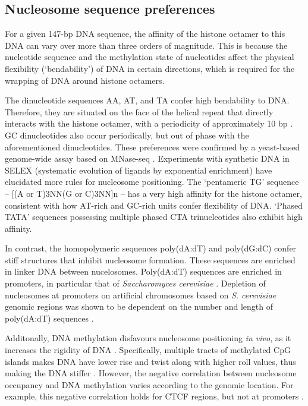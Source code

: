 \documentclass[parskip=full, numbers=noenddot]{scrreprt}
\begin{document}
\subsection{Nucleosome sequence preferences}
\label{ssec:emsaselex_intro_seqpref}

For a given 147-bp DNA sequence, the affinity of the histone octamer to this DNA can vary over more than three orders of magnitude.  This is because the nucleotide sequence and the methylation state of nucleotides affect the physical flexibility (`bendability') of DNA in certain directions, which is required for the wrapping of DNA around histone octamers.

The dinucleotide sequences AA, AT, and TA confer high bendability to DNA.  Therefore, they are situated on the face of the helical repeat that directly interacts with the histone octamer, with a periodicity of approximately 10 bp \citep{struhl_determinants_2013}.  GC dinucleotides also occur periodically, but out of phase with the aforementioned dinucleotides.  These preferences were confirmed by a yeast-based genome-wide assay based on MNase-seq \citep{segal_genomic_2006}.  Experiments with synthetic DNA in SELEX (systematic evolution of ligands by exponential enrichment) \citep{lowary_new_1998} have elucidated more rules for nucleosome positioning.  The `pentameric TG' sequence -- [(A or T)3NN(G or C)3NN]n -- has a very high affinity for the histone octamer, consistent with how AT-rich and GC-rich units confer flexibility of DNA.  `Phased TATA' sequences possessing multiple phased CTA trinucleotides also exhibit high affinity.

In contrast, the homopolymeric sequences poly(dA:dT) and poly(dG:dC) confer stiff structures that inhibit nucleosome formation.  These sequences are enriched in linker DNA between nucelosomes.  Poly(dA:dT) sequences are enriched in promoters, in particular that of \emph{Saccharomyces cerevisiae} \citep{struhl_determinants_2013}.  Depletion of nucleosomes at promoters on artificial chromosomes based on \emph{S. cerevisiae} genomic regions was shown to be dependent on the number and length of poly(dA:dT) sequences \citep{hughes_functional_2012}.

Additonally, DNA methylation disfavours nucleosome positioning \emph{in vivo}, as it increases the rigidity of DNA \citep{huff_dnmt1-independent_2014}.  Specifically, multiple tracts of methylated CpG islands makes DNA have lower rise and twist along with higher roll values, thus making the DNA stiffer \citep{rao_systematic_2018, perez_impact_2012}.  However, the negative correlation between nucleosome occupancy and DNA methylation varies according to the genomic location.  For example, this negative correlation holds for CTCF regions, but not at promoters \citep{kelly_genome-wide_2012}.
\end{document}
